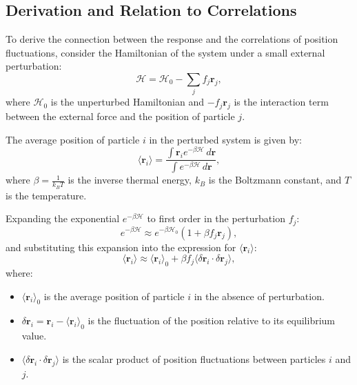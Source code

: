 \documentclass[English, Lau, oneside]{sapthesis}
\begin{document}
\subsection{Derivation and Relation to Correlations}

\noindent To derive the connection between the response and the correlations of position fluctuations, consider the Hamiltonian of the system under a small external perturbation:
\begin{equation}
\mathcal{H} = \mathcal{H}_0 - \sum_j f_j \mathbf{r}_j,
\end{equation}
where $\mathcal{H}_0$ is the unperturbed Hamiltonian and $-f_j \mathbf{r}_j$ is the interaction term between the external force and the position of particle $j$.

\noindent The average position of particle $i$ in the perturbed system is given by:
\begin{equation}
\langle \mathbf{r}_i \rangle = \frac{\int \mathbf{r}_i e^{-\beta \mathcal{H}} \, d\mathbf{r}}{\int e^{-\beta \mathcal{H}} \, d\mathbf{r}},
\end{equation}
where $\beta = \frac{1}{k_B T}$ is the inverse thermal energy, $k_B$ is the Boltzmann constant, and $T$ is the temperature.

\noindent Expanding the exponential $e^{-\beta \mathcal{H}}$ to first order in the perturbation $f_j$:
\begin{equation}
e^{-\beta \mathcal{H}} \approx e^{-\beta \mathcal{H}_0} \left( 1 + \beta f_j \mathbf{r}_j \right),
\end{equation}
and substituting this expansion into the expression for $\langle \mathbf{r}_i \rangle$:
\begin{equation}
\langle \mathbf{r}_i \rangle \approx \langle \mathbf{r}_i \rangle_0 + \beta f_j \langle \delta \mathbf{r}_i \cdot \delta \mathbf{r}_j \rangle,
\end{equation}
where:
\begin{itemize}
    \item $\langle \mathbf{r}_i \rangle_0$ is the average position of particle $i$ in the absence of perturbation.
    \item $\delta \mathbf{r}_i = \mathbf{r}_i - \langle \mathbf{r}_i \rangle_0$ is the fluctuation of the position relative to its equilibrium value.
    \item $\langle \delta \mathbf{r}_i \cdot \delta \mathbf{r}_j \rangle$ is the scalar product of position fluctuations between particles $i$ and $j$.
\end{itemize}
\end{document}
